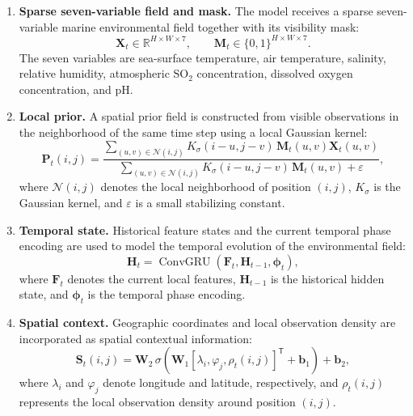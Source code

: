 \documentclass[conference]{IEEEtran}
\begin{document}
\begin{enumerate}
    \item \textbf{Sparse seven-variable field and mask.}
    The model receives a sparse seven-variable marine environmental field
    together with its visibility mask:
    \begin{equation}
    \mathbf{X}_t \in \mathbb{R}^{H\times W\times 7},\qquad
    \mathbf{M}_t \in \{0,1\}^{H\times W\times 7}.
    \label{eq:input}
    \end{equation}
    The seven variables are sea-surface temperature, air temperature,
    salinity, relative humidity, atmospheric $\mathrm{SO_2}$ concentration,
    dissolved oxygen concentration, and pH.

    \item \textbf{Local prior.}
    A spatial prior field is constructed from visible observations in the
    neighborhood of the same time step using a local Gaussian kernel:
    \begin{equation}
    \mathbf{P}_t(i,j)
    =
    \frac{
    \displaystyle\sum_{(u,v)\in\mathcal{N}(i,j)}
    K_{\sigma}(i-u,j-v)\,
    \mathbf{M}_t(u,v)\mathbf{X}_t(u,v)
    }{
    \displaystyle\sum_{(u,v)\in\mathcal{N}(i,j)}
    K_{\sigma}(i-u,j-v)\,
    \mathbf{M}_t(u,v)+\varepsilon
    },
    \label{eq:local-prior}
    \end{equation}
    where $\mathcal{N}(i,j)$ denotes the local neighborhood of position
    $(i,j)$, $K_{\sigma}$ is the Gaussian kernel, and $\varepsilon$ is a
    small stabilizing constant.

    \item \textbf{Temporal state.}
    Historical feature states and the current temporal phase encoding are
    used to model the temporal evolution of the environmental field:
    \begin{equation}
\mathbf{H}_t
    =
    \operatorname{ConvGRU}
    \left(
    \mathbf{F}_t,\mathbf{H}_{t-1},
    \boldsymbol{\phi}_t
    \right),
\label{eq:temporal-state}
\end{equation}
    where $\mathbf{F}_t$ denotes the current local features,
    $\mathbf{H}_{t-1}$ is the historical hidden state, and
    $\boldsymbol{\phi}_t$ is the temporal phase encoding.

    \item \textbf{Spatial context.}
    Geographic coordinates and local observation density are incorporated as
    spatial contextual information:
    \begin{equation}
\mathbf{S}_t(i,j)
    =
\mathbf{W}_2\,\sigma\!\left(\mathbf{W}_1[\lambda_i,\varphi_j,\rho_t(i,j)]^{\mathsf T}+\mathbf{b}_1\right)+\mathbf{b}_2,
\label{eq:spatial-context}
\end{equation}
    where $\lambda_i$ and $\varphi_j$ denote longitude and latitude,
    respectively, and $\rho_t(i,j)$ represents the local observation density
    around position $(i,j)$.


\end{enumerate}
\end{document}
